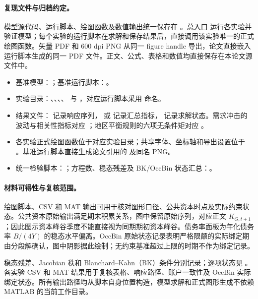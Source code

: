 \documentclass[12pt,UTF8]{ctexart}
\begin{document}
	\paragraph{复现文件与归档约定。}
	模型源代码、运行脚本、绘图函数及数值输出统一保存在 。总入口  运行各实验并验证模型；每个实验的运行脚本在求解和保存结果后，直接调用该实验唯一的正式绘图函数。矢量 PDF 和 600 dpi PNG 从同一 figure handle 导出，论文直接嵌入运行脚本生成的同一 PDF 文件。正文、公式、表格和数值均直接保存在本论文源文件中。
	\begin{itemize}[leftmargin=2em,itemsep=0.1em]
		\item 基准模型：；基准运行脚本：。
		\item 实验目录：、、、、 与 ，对应运行脚本采用  命名。
		\item 结果文件： 记录响应序列， 或  记录汇总指标， 记录求解状态。需求冲击的波动与相关性指标对应 ；地区平衡规则的六项无条件矩对应 。
		\item 各实验正式绘图函数位于对应实验目录；共享字体、坐标轴和导出设置位于 。基准运行脚本直接生成论文引用的  及同名 PNG。
		\item 统一检验脚本：；方程数、稳态残差及 BK/OccBin 状态汇总：。
	\end{itemize}
	
	\paragraph{材料可得性与复核范围。}
	绘图脚本、CSV 和 MAT 输出可用于核对图形口径、公共资本时点及实际约束状态。公共资本原始输出满足期末积累关系，图中保留原始序列，对应正文 $K_{G,t+1}$；因此图示资本峰谷季度不能直接视为同期期初资本峰谷。债务率面板为年化债务率 $B/(4Y)$ 的稳态水平偏离。OccBin 原始状态记录表明严格限额的实际绑定期由分段解确认，图中阴影据此绘制；无约束基准超过上限的时期不作为绑定记录。
	
	稳态残差、Jacobian 秩和 Blanchard--Kahn（BK）条件分别记录；逐项状态见 。各实验 CSV 和 MAT 结果用于复核表格、响应路径、账户一致性及 OccBin 实际绑定状态。所有输出路径均从脚本自身位置构造，模型求解和正式图形生成不依赖 MATLAB 的当前工作目录。
	
\end{document}
